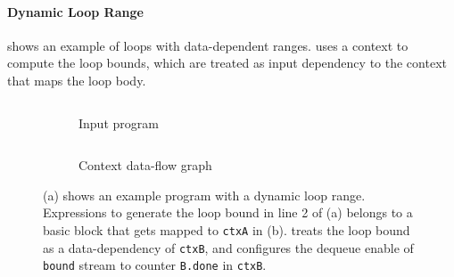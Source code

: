 \paragraph{Dynamic Loop Range}
 shows an example of loops with data-dependent ranges. 
\name uses a context to compute the loop bounds, which are treated as input dependency to the context 
that maps the loop body.
\begin{figure}
\centering
\begin{subfigure}[b]{0.4\textwidth}
\inputminted{python}{code/dynrange.py}
\caption{Input program}
\end{subfigure}
\hfill
\begin{subfigure}[b]{0.5\textwidth}
\inputminted{python}{code/dynrangectx.py}
\caption{Context data-flow graph}
\end{subfigure}
\caption[Example of dynamic loop range]{
  (a) shows an example program with a dynamic loop range. 
  Expressions to generate the loop bound in line 2 of (a) belongs to a basic block that gets mapped
  to \texttt{ctxA} in (b).
  \name treats the loop bound as a data-dependency of \texttt{ctxB}, and
  configures the dequeue enable of \texttt{bound} stream to counter \texttt{B.done} in \texttt{ctxB}.
}
\label{fig:dynrange}
\end{figure}

